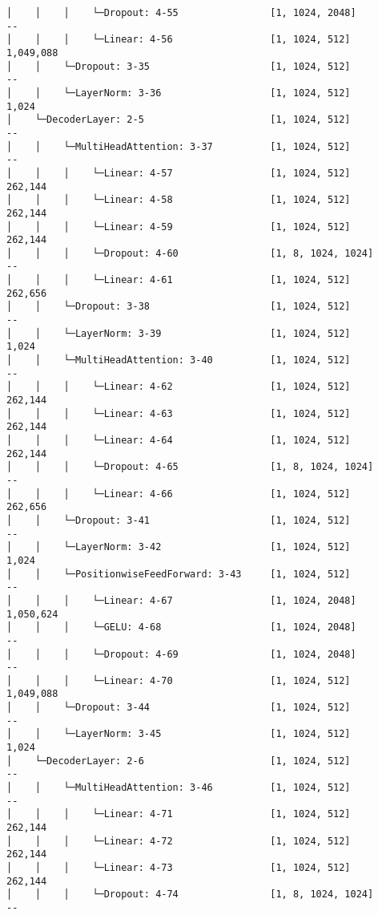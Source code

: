 \documentclass[12pt]{article}
\begin{document}
\begin{Verbatim}[commandchars=\\\{\}]
│    │    │    └─Dropout: 4-55                [1, 1024, 2048]           --
│    │    │    └─Linear: 4-56                 [1, 1024, 512]
1,049,088
│    │    └─Dropout: 3-35                     [1, 1024, 512]            --
│    │    └─LayerNorm: 3-36                   [1, 1024, 512]            1,024
│    └─DecoderLayer: 2-5                      [1, 1024, 512]            --
│    │    └─MultiHeadAttention: 3-37          [1, 1024, 512]            --
│    │    │    └─Linear: 4-57                 [1, 1024, 512]            262,144
│    │    │    └─Linear: 4-58                 [1, 1024, 512]            262,144
│    │    │    └─Linear: 4-59                 [1, 1024, 512]            262,144
│    │    │    └─Dropout: 4-60                [1, 8, 1024, 1024]        --
│    │    │    └─Linear: 4-61                 [1, 1024, 512]            262,656
│    │    └─Dropout: 3-38                     [1, 1024, 512]            --
│    │    └─LayerNorm: 3-39                   [1, 1024, 512]            1,024
│    │    └─MultiHeadAttention: 3-40          [1, 1024, 512]            --
│    │    │    └─Linear: 4-62                 [1, 1024, 512]            262,144
│    │    │    └─Linear: 4-63                 [1, 1024, 512]            262,144
│    │    │    └─Linear: 4-64                 [1, 1024, 512]            262,144
│    │    │    └─Dropout: 4-65                [1, 8, 1024, 1024]        --
│    │    │    └─Linear: 4-66                 [1, 1024, 512]            262,656
│    │    └─Dropout: 3-41                     [1, 1024, 512]            --
│    │    └─LayerNorm: 3-42                   [1, 1024, 512]            1,024
│    │    └─PositionwiseFeedForward: 3-43     [1, 1024, 512]            --
│    │    │    └─Linear: 4-67                 [1, 1024, 2048]
1,050,624
│    │    │    └─GELU: 4-68                   [1, 1024, 2048]           --
│    │    │    └─Dropout: 4-69                [1, 1024, 2048]           --
│    │    │    └─Linear: 4-70                 [1, 1024, 512]
1,049,088
│    │    └─Dropout: 3-44                     [1, 1024, 512]            --
│    │    └─LayerNorm: 3-45                   [1, 1024, 512]            1,024
│    └─DecoderLayer: 2-6                      [1, 1024, 512]            --
│    │    └─MultiHeadAttention: 3-46          [1, 1024, 512]            --
│    │    │    └─Linear: 4-71                 [1, 1024, 512]            262,144
│    │    │    └─Linear: 4-72                 [1, 1024, 512]            262,144
│    │    │    └─Linear: 4-73                 [1, 1024, 512]            262,144
│    │    │    └─Dropout: 4-74                [1, 8, 1024, 1024]        --

\end{Verbatim}
\end{document}

